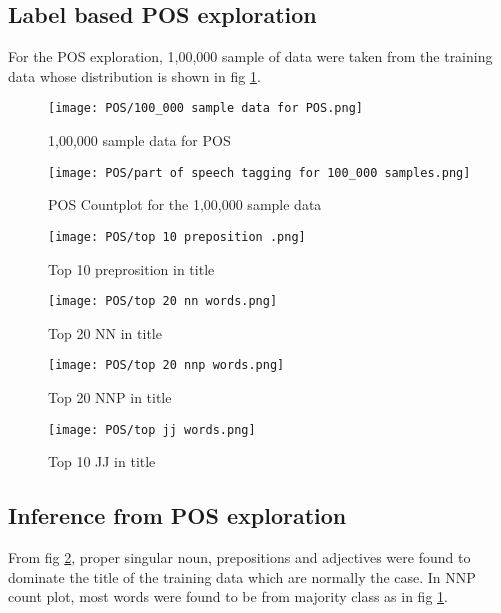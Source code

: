 \subsection{Label based POS exploration}
For the POS exploration, 1,00,000 sample of data were taken from the training data whose distribution is shown in fig \ref{fig:1,00,000 sample data for POS}.

\begin{figure}[H]
    \centering
    \texttt{[image: POS/100\_000 sample data for POS.png]}
    \caption{1,00,000 sample data for POS}
    \label{fig:1,00,000 sample data for POS}
\end{figure}

\begin{figure}[H]
    \centering
    \texttt{[image: POS/part of speech tagging for 100\_000 samples.png]}
    \caption{POS Countplot for the 1,00,000 sample data}
    \label{fig:POS Countplot for the 1,00,000 sample data}
\end{figure}

\begin{figure}[H]
    \centering
    \texttt{[image: POS/top 10 preposition .png]}
    \caption{Top 10 preprosition in title}
    \label{fig:Top 10 preprosition in title}
\end{figure}

\begin{figure}[H]
    \centering
    \texttt{[image: POS/top 20 nn words.png]}
    \caption{Top 20 NN in title}
    \label{fig:Top 20 NN in title}
\end{figure}

\begin{figure}[H]
    \centering
    \texttt{[image: POS/top 20 nnp words.png]}
    \caption{Top 20 NNP in title}
    \label{fig:Top 20 NNP in title}
\end{figure}

\begin{figure}[H]
    \centering
    \texttt{[image: POS/top jj words.png]}
    \caption{Top 10 JJ in title}
    \label{fig:Top 10 JJ in title}
\end{figure}

\subsection{Inference from POS exploration}
From fig \ref{fig:POS Countplot for the 1,00,000 sample data}, proper singular noun, prepositions and adjectives were found to dominate the title of the training data which are normally the case. In NNP count plot, most words were found to be from majority class as in fig \ref{fig:1,00,000 sample data for POS}.

